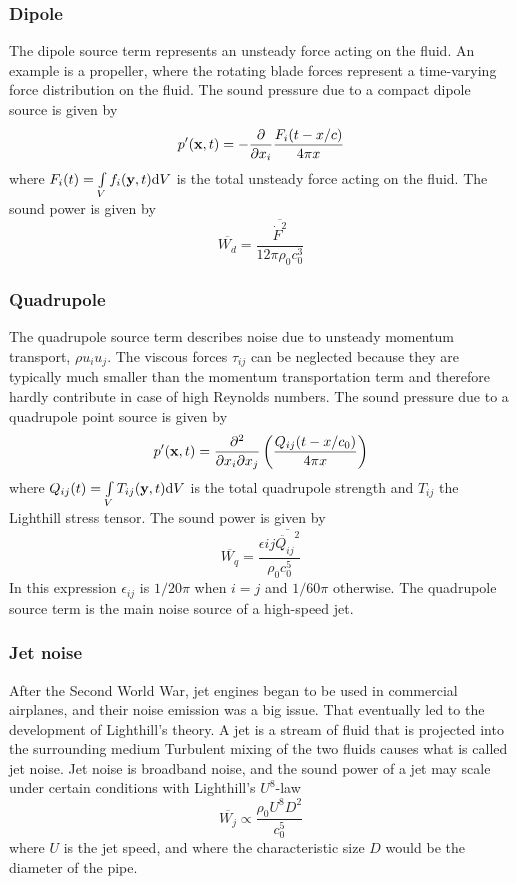 \subsubsection*{Dipole}
The dipole source term represents an unsteady force
acting on the fluid. An example is a propeller, where the rotating blade forces represent a time-varying force distribution on the fluid.
The sound pressure due to a compact dipole source is given by
\begin{equation}
  p'(\mathbf{x}, t) = - \frac{\partial}{\partial x_i} \frac{F_i (t-x/c)}{4 \pi x}
\end{equation}
where $F_i(t) = \int\limits_V f_i(\mathbf{y},t) \mathrm{d}V$ is the total unsteady force acting on the fluid.
The sound power is given by
\begin{equation}
  \overline{W_d} = \frac{\overline{\dot{F}^2}}{12 \pi \rho_0 c_0^3}
\end{equation}

\subsubsection*{Quadrupole}
The quadrupole source term describes noise due to unsteady
momentum transport, $\rho u_i u_j$. The viscous forces $\tau_{ij}$ can be
neglected because they are typically much smaller than the momentum
transportation term and therefore hardly contribute in case of high Reynolds
numbers. The sound pressure due to a quadrupole point source is given by
\begin{equation}
  p'(\mathbf{x},t) = \frac{\partial^2}{\partial x_i \partial x_j} \left( \frac{Q_{ij} (t-x/c_0)}{4 \pi x}  \right)
\end{equation}
where $Q_{ij}(t) = \int\limits_V T_{ij}(\mathbf{y},t) \mathrm{d} V$ is the total quadrupole strength and $T_{ij}$ the Lighthill stress tensor.
The sound power is given by
\begin{equation}
  \overline{W_q} = \frac{\epsilon{ij} \overline{\ddot{Q_{ij}}^2} }{\rho_0 c_0^5}
\end{equation}
In this expression $\epsilon_{ij}$ is $1/20\pi$ when $i=j$ and $1/60\pi$ otherwise.
The quadrupole source term is the main noise source of a high-speed jet.

\subsubsection*{Jet noise}
After the Second World War, jet engines began to be used in commercial
airplanes, and their noise emission was a big issue. That eventually led to the
development of Lighthill's theory.
A jet is a stream of fluid that is projected into the surrounding medium
Turbulent mixing of the two fluids causes what is called jet noise. Jet noise is broadband noise, and the
sound power of a jet may scale under certain conditions with Lighthill's $U^8$-law
\begin{equation}
  \overline{W_{j}} \propto \frac{\rho_0 U^8 D^2}{c_0^5}
\end{equation}
where $U$ is the jet speed, and where the characteristic size $D$ would be the diameter of the pipe.

